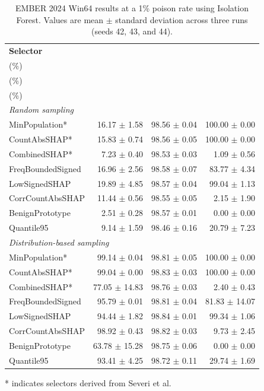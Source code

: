 \begin{table}[!t]
    \centering
    \caption{EMBER 2024 Win64 results at a 1\% poison rate using Isolation Forest. Values are mean $\pm$ standard deviation across three runs (seeds 42, 43, and 44).}
    \label{tab:ember2024_1p_if_3seeds}
    \setlength{\tabcolsep}{3.0pt}
    \renewcommand{\arraystretch}{1.08}
    \begin{tabular}{lrrr}
        \toprule
        \textbf{Selector} &
        \makecell{\textbf{ASR}\\($\%$)} &
        \makecell{\textbf{Clean accuracy}\\($\%$)} &
        \makecell{\textbf{Poison recall}\\($\%$)} \\
        \midrule
        \multicolumn{4}{l}{\textit{Random sampling}} \\
        MinPopulation*       & 16.17 $\pm$ 1.58 & 98.56 $\pm$ 0.04 & 100.00 $\pm$ 0.00 \\
        CountAbsSHAP*        & 15.83 $\pm$ 0.74 & 98.56 $\pm$ 0.05 & 100.00 $\pm$ 0.00 \\
        CombinedSHAP*        & 7.23 $\pm$ 0.40 & 98.53 $\pm$ 0.03 & 1.09 $\pm$ 0.56 \\
        FreqBoundedSigned    & 16.96 $\pm$ 2.56 & 98.58 $\pm$ 0.07 & 83.77 $\pm$ 4.34 \\
        LowSignedSHAP        & 19.89 $\pm$ 4.85 & 98.57 $\pm$ 0.04 & 99.04 $\pm$ 1.13 \\
        CorrCountAbsSHAP     & 11.44 $\pm$ 0.56 & 98.55 $\pm$ 0.05 & 2.15 $\pm$ 1.90 \\
        BenignPrototype      & 2.51 $\pm$ 0.28 & 98.57 $\pm$ 0.01 & 0.00 $\pm$ 0.00 \\
        Quantile95           & 9.14 $\pm$ 1.59 & 98.46 $\pm$ 0.16 & 20.79 $\pm$ 7.23 \\
        \midrule
        \multicolumn{4}{l}{\textit{Distribution-based sampling}} \\
        MinPopulation*       & 99.14 $\pm$ 0.04 & 98.81 $\pm$ 0.05 & 100.00 $\pm$ 0.00 \\
        CountAbsSHAP*        & 99.04 $\pm$ 0.00 & 98.83 $\pm$ 0.03 & 100.00 $\pm$ 0.00 \\
        CombinedSHAP*        & 77.05 $\pm$ 14.83 & 98.76 $\pm$ 0.03 & 2.40 $\pm$ 0.43 \\
        FreqBoundedSigned    & 95.79 $\pm$ 0.01 & 98.81 $\pm$ 0.04 & 81.83 $\pm$ 14.07 \\
        LowSignedSHAP        & 94.44 $\pm$ 1.82 & 98.84 $\pm$ 0.01 & 99.34 $\pm$ 1.06 \\
        CorrCountAbsSHAP     & 98.92 $\pm$ 0.43 & 98.82 $\pm$ 0.03 & 9.73 $\pm$ 2.45 \\
        BenignPrototype      & 63.78 $\pm$ 15.28 & 98.75 $\pm$ 0.06 & 0.00 $\pm$ 0.00 \\
        Quantile95           & 93.41 $\pm$ 4.25 & 98.72 $\pm$ 0.11 & 29.74 $\pm$ 1.69 \\
        \bottomrule
    \end{tabular}
    \vspace{0.5mm}
    \raggedright
    * indicates selectors derived from Severi et al.
\end{table}
